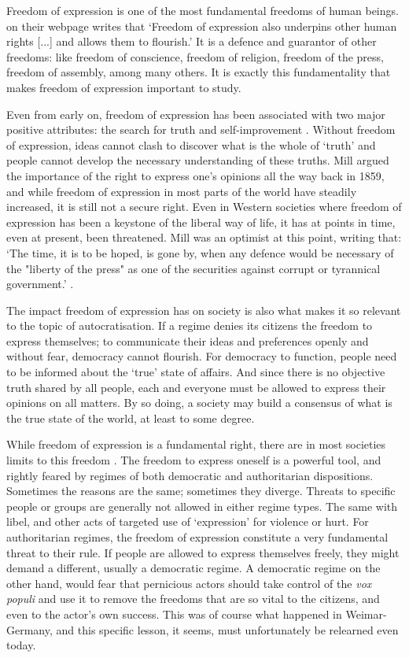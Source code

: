Freedom of expression is one of the most fundamental freedoms of human beings. \citet{amnesty_international_freedom_2023} on their webpage writes that `Freedom of expression also underpins other human rights [...] and allows them to flourish.'  It is a defence and guarantor of other freedoms: like freedom of conscience, freedom of religion, freedom of the press, freedom of assembly, among many others. It is exactly this fundamentality that makes freedom of expression important to study.

Even from early on, freedom of expression has been associated with two major positive attributes: the search for truth and self-improvement \citep[pp. 25-80]{mill_liberty_2010}. Without freedom of expression, ideas cannot clash to discover what is the whole of `truth' and people cannot develop the necessary understanding of these truths. Mill argued the importance of the right to express one's opinions all the way back in 1859, and while freedom of expression in most parts of the world have steadily increased, it is still not a secure right. Even in Western societies where freedom of expression has been a keystone of the liberal way of life, it has at points in time, even at present, been threatened. Mill was an optimist at this point, writing that: `The time, it is to be hoped, is gone by, when any defence would be necessary of the "liberty of the press" as one of the securities against corrupt or tyrannical government.'  \citep[p. 25]{mill_liberty_2010}.

The impact freedom of expression has on society is also what makes it so relevant to the topic of autocratisation. If a regime denies its citizens the freedom to express themselves; to communicate their ideas and preferences openly and without fear, democracy cannot flourish. For democracy to function, people need to be informed about the `true' state of affairs. And since there is no objective truth shared by all people, each and everyone must be allowed to express their opinions on all matters. By so doing, a society may build a consensus of what is the true state of the world, at least to some degree. 

While freedom of expression is a fundamental right, there are in most societies limits to this freedom \citep{bonotti_freedom_2021}. The freedom to express oneself is a powerful tool, and rightly feared by regimes of both democratic and authoritarian dispositions. Sometimes the reasons are the same; sometimes they diverge. Threats to specific people or groups are generally not allowed in either regime types. The same with libel, and other acts of targeted use of `expression' for violence or hurt. For authoritarian regimes, the freedom of expression constitute a very fundamental threat to their rule. If people are allowed to express themselves freely, they might demand a different, usually a democratic regime. A democratic regime on the other hand, would fear that pernicious actors should take control of the \textit{vox populi} and use it to remove the freedoms that are so vital to the citizens, and even to the actor's own success. This was of course what happened in Weimar-Germany, and this specific lesson, it seems, must unfortunately be relearned even today. 

